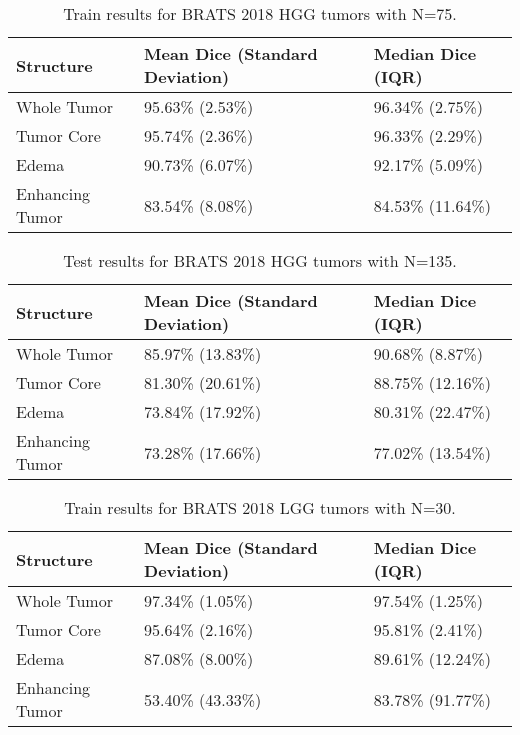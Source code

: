 \documentclass[11pt]{article}
\begin{document}
\begin{table}[H]
\centering
\begin{tabular}{@{}lll@{}}
\toprule
Structure & Mean Dice (Standard Deviation) & Median Dice (IQR) \\ \midrule
Whole Tumor & 95.63\% (2.53\%) & 96.34\% (2.75\%) \\
Tumor Core & 95.74\% (2.36\%) & 96.33\% (2.29\%) \\
Edema & 90.73\% (6.07\%) & 92.17\% (5.09\%) \\
Enhancing Tumor & 83.54\% (8.08\%) & 84.53\% (11.64\%) \\ \bottomrule
\end{tabular}
\caption{Train results for BRATS 2018 HGG tumors with N=75.}
\label{brats-hgg-train}
\end{table}
\begin{table}[H]
\centering
\begin{tabular}{@{}lll@{}}
\toprule
Structure & Mean Dice (Standard Deviation) & Median Dice (IQR) \\ \midrule
Whole Tumor & 85.97\% (13.83\%) & 90.68\% (8.87\%) \\
Tumor Core & 81.30\% (20.61\%) & 88.75\% (12.16\%) \\
Edema & 73.84\% (17.92\%) & 80.31\% (22.47\%) \\
Enhancing Tumor & 73.28\% (17.66\%) & 77.02\% (13.54\%) \\ \bottomrule
\end{tabular}
\caption{Test results for BRATS 2018 HGG tumors with N=135.}
\label{brats-hgg-test}
\end{table}
\begin{table}[H]
\centering
\begin{tabular}{@{}lll@{}}
\toprule
Structure       & Mean Dice (Standard Deviation) & Median Dice (IQR) \\ \midrule
Whole Tumor     & 97.34\% (1.05\%)               & 97.54\% (1.25\%)  \\
Tumor Core      & 95.64\% (2.16\%)               & 95.81\% (2.41\%)  \\
Edema           & 87.08\% (8.00\%)               & 89.61\% (12.24\%) \\
Enhancing Tumor & 53.40\% (43.33\%)              & 83.78\% (91.77\%) \\ \bottomrule
\end{tabular}
\caption{Train results for BRATS 2018 LGG tumors with N=30.}
\label{brats-lgg-train}
\end{table}
\end{document}
